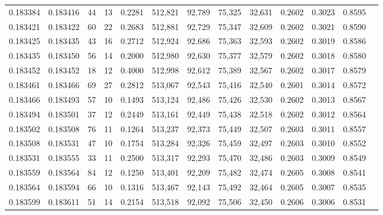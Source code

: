 \begin{tabular}{rrrrrrrrrrrrr}
0.183384 & 0.183416 &    44 &  13 &                                     0.2281 & 512,821 &  92,789 &  75,325 &  32,631 & 0.2602 & 0.3023 & 0.8595 \\
0.183421 & 0.183422 &    60 &  22 &                                     0.2683 & 512,881 &  92,729 &  75,347 &  32,609 & 0.2602 & 0.3021 & 0.8590 \\
0.183425 & 0.183435 &    43 &  16 &                                     0.2712 & 512,924 &  92,686 &  75,363 &  32,593 & 0.2602 & 0.3019 & 0.8586 \\
0.183435 & 0.183450 &    56 &  14 &                                     0.2000 & 512,980 &  92,630 &  75,377 &  32,579 & 0.2602 & 0.3018 & 0.8580 \\
0.183452 & 0.183452 &    18 &  12 &                                     0.4000 & 512,998 &  92,612 &  75,389 &  32,567 & 0.2602 & 0.3017 & 0.8579 \\
0.183461 & 0.183466 &    69 &  27 &                                     0.2812 & 513,067 &  92,543 &  75,416 &  32,540 & 0.2601 & 0.3014 & 0.8572 \\
0.183466 & 0.183493 &    57 &  10 &                                     0.1493 & 513,124 &  92,486 &  75,426 &  32,530 & 0.2602 & 0.3013 & 0.8567 \\
0.183494 & 0.183501 &    37 &  12 &                                     0.2449 & 513,161 &  92,449 &  75,438 &  32,518 & 0.2602 & 0.3012 & 0.8564 \\
0.183502 & 0.183508 &    76 &  11 &                                     0.1264 & 513,237 &  92,373 &  75,449 &  32,507 & 0.2603 & 0.3011 & 0.8557 \\
0.183508 & 0.183531 &    47 &  10 &                                     0.1754 & 513,284 &  92,326 &  75,459 &  32,497 & 0.2603 & 0.3010 & 0.8552 \\
0.183531 & 0.183555 &    33 &  11 &                                     0.2500 & 513,317 &  92,293 &  75,470 &  32,486 & 0.2603 & 0.3009 & 0.8549 \\
0.183559 & 0.183564 &    84 &  12 &                                     0.1250 & 513,401 &  92,209 &  75,482 &  32,474 & 0.2605 & 0.3008 & 0.8541 \\
0.183564 & 0.183594 &    66 &  10 &                                     0.1316 & 513,467 &  92,143 &  75,492 &  32,464 & 0.2605 & 0.3007 & 0.8535 \\
0.183599 & 0.183611 &    51 &  14 &                                     0.2154 & 513,518 &  92,092 &  75,506 &  32,450 & 0.2606 & 0.3006 & 0.8531 \\

\end{tabular}
